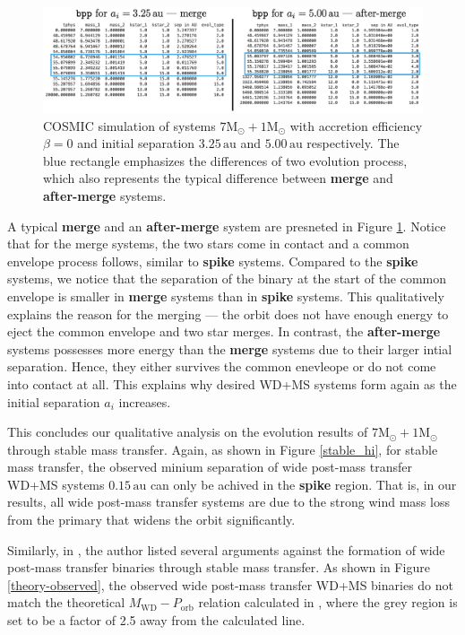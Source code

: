 \documentclass[12pt]{article}
\newcommand{\Msun}{\mathrm{M_{\odot}}}
\newcommand{\au}{\, \mathrm{au}}
\begin{document}
\begin{figure}
    \centering
    \includegraphics[width=\linewidth]{merge-after-merge.png}
    \caption{COSMIC simulation of systems $7 \Msun + 1 \Msun$ with accretion efficiency $\beta = 0$ and initial separation $3.25 \au$ and $5.00 \au$ respectively. The blue rectangle emphasizes the differences of two evolution process, which also represents the typical difference between \textbf{merge} and \textbf{after-merge} systems.}
    \label{merge-after-merge}
\end{figure}

A typical \textbf{merge} and an \textbf{after-merge} system are presneted in Figure \ref{merge-after-merge}. Notice that for the merge systems, the two stars come in contact and a common envelope process follows, similar to \textbf{spike} systems. Compared to the \textbf{spike} systems, we notice that the separation of the binary at the start of the common envelope is smaller in \textbf{merge} systems than in \textbf{spike} systems. This qualitatively explains the reason for the merging — the orbit does not have enough energy to eject the common envelope and two star merges. In contrast, the \textbf{after-merge} systems possesses more energy than the \textbf{merge} systems due to their larger intial separation. Hence, they either survives the common enevleope or do not come into contact at all. This explains why desired WD+MS systems form again as the initial separation $a_i$ increases.

This concludes our qualitative analysis on the evolution results of $7\Msun + 1\Msun$ through stable mass transfer. Again, as shown in Figure \ref{stable_hi}, for stable mass transfer, the observed minium separation of wide post-mass transfer WD+MS systems $0.15 \au$ can only be achived in the \textbf{spike} region. That is, in our results, all wide post-mass transfer systems are due to the strong wind mass loss from the primary that widens the orbit significantly.

Similarly, in \cite{yamaguchi_lo}, the author listed several arguments against the formation of wide post-mass transfer binaries through stable mass transfer. As shown in Figure \ref{theory-observed}, the observed wide post-mass transfer WD+MS binaries do not match the theoretical $M_{\mathrm{WD}} - P_{\mathrm{orb}}$ relation calculated in \cite{rappaport1995relation}, where the grey region is set to be a factor of 2.5 away from the calculated line.
\end{document}
